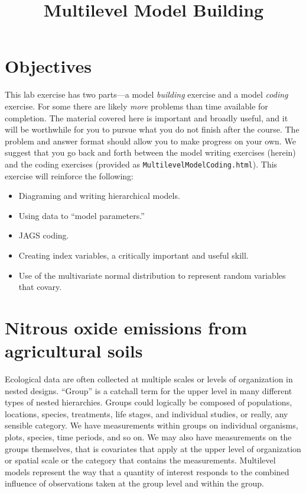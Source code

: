 \documentclass[12pt, oneside]{article}
\title{\vspace{-1cm}Multilevel Model Building}
\begin{document}
\maketitle

\thispagestyle{fancy}

\section*{Objectives}
This lab exercise has two parts---a model \emph{building} exercise and a model \emph{coding} exercise.  For some there are likely \emph{more} problems than time available for completion. The material covered here is important and broadly useful, and it will be worthwhile for you to pursue what you do not finish after the course. The problem and answer format should allow you to make progress on your own. We suggest that you go back and forth between the model writing exercises (herein) and the coding exercises (provided as \texttt{MultilevelModelCoding.html}). This exercise will reinforce the following:

\begin{itemize}
\item Diagraming and writing hierarchical models.
\item Using data to ``model parameters.''
\item JAGS coding.
\item Creating index variables, a critically important and useful skill.
\item Use of the multivariate normal distribution to represent random variables that covary.
\end{itemize}

\newpage

\section*{Nitrous oxide emissions from agricultural soils}

Ecological data are often collected at multiple scales or levels of organization in nested designs. ``Group'' is a catchall term for the upper level in many different types of nested hierarchies. Groups could logically be composed of populations, locations, species, treatments, life stages, and individual studies, or really, any sensible category. We have measurements within groups on individual organisms, plots, species, time periods, and so on. We may also have measurements on the groups themselves, that is covariates that apply at the upper level of organization or spatial scale or the category that contains the measurements. Multilevel models represent the way that a quantity of interest responds to the combined influence of observations taken at the group level and within the group. 
\end{document}
